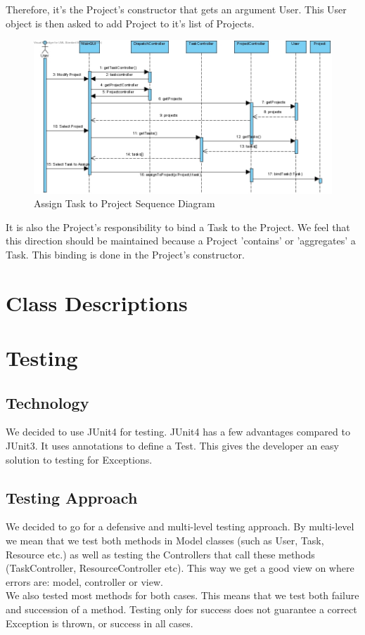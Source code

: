 			Therefore, it's the Project's constructor that gets an argument User. This User object is then asked to add Project to it's list of Projects.
			\begin{figure}[h!]
				\begin{center}
					\includegraphics[scale=0.5]{images/assign_task_to_project.jpg}
				\end{center}
				\caption{Assign Task to Project Sequence Diagram}
			\end{figure}
			It is also the Project's responsibility to bind a Task to the Project. We feel that this direction should be maintained because a Project 'contains' or 'aggregates' a Task. This binding is done in the Project's constructor.			
			
	\section{Class Descriptions}
		
	\section{Testing}
		\subsection{Technology}
		We decided to use JUnit4 for testing.
		JUnit4 has a few advantages compared to JUnit3. It uses annotations to define a Test. This gives the developer an easy solution to testing for Exceptions.
		\subsection{Testing Approach}
		We decided to go for a defensive and multi-level testing approach.
		By multi-level we mean that we test both methods in Model classes (such as User, Task, Resource etc.) as well as testing the Controllers that call these methods (TaskController, ResourceController etc). 
		This way we get a good view on where errors are: model, controller or view.\\
		We also tested most methods for both cases. This means that we test both failure and succession of a method. Testing only for success does not guarantee a correct Exception is thrown, or success in all cases.
